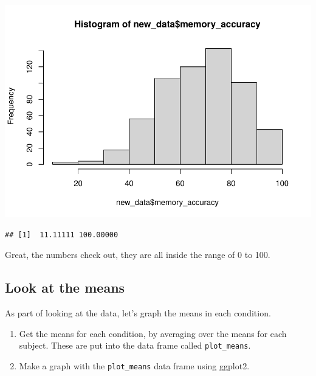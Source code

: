 \documentclass[
]{book}
\newenvironment{Shaded}{\begin{snugshade}}{\end{snugshade}}
\newcommand{\FunctionTok}[1]{\textcolor[rgb]{0.13,0.29,0.53}{\textbf{#1}}}
\newcommand{\NormalTok}[1]{#1}
\newcommand{\SpecialCharTok}[1]{\textcolor[rgb]{0.81,0.36,0.00}{\textbf{#1}}}
\begin{document}
\begin{Shaded}
\end{Shaded}

\includegraphics{Statistics_Lab_files/figure-latex/unnamed-chunk-590-1.pdf}

\begin{Shaded}
\end{Shaded}

\begin{verbatim}
## [1]  11.11111 100.00000
\end{verbatim}

Great, the numbers check out, they are all inside the range of 0 to 100.

\hypertarget{look-at-the-means-2}{%
\subsection{Look at the means}\label{look-at-the-means-2}}

As part of looking at the data, let's graph the means in each condition.

\begin{enumerate}
\def\labelenumi{\arabic{enumi}.}
\item
  Get the means for each condition, by averaging over the means for each subject. These are put into the data frame called \texttt{plot\_means}.
\item
  Make a graph with the \texttt{plot\_means} data frame using ggplot2.
\end{enumerate}
\end{document}
